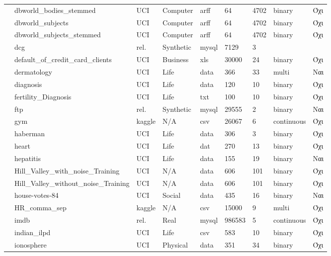{\begin{longtable}{|l| l| l | l | l | l |l | l | l | }
 							\rownumber & dbworld\_bodies\_stemmed & UCI & Computer & arff & 64 & 4702 & binary & Όχι \\
 							\rownumber & dbworld\_subjects & UCI & Computer & arff & 64 & 4702 & binary & Όχι \\
 							\rownumber & dbworld\_subjects\_stemmed & UCI & Computer & arff & 64 & 4702 & binary & Όχι \\
 							\rownumber & dcg \citep{dcg} & rel. & Synthetic & mysql & 7129 & 3 & & \\
 							\rownumber & default\_of\_credit\_card\_clients \citep{default} & UCI & Business & xls & 30000 & 24 & binary & Όχι \\
 							\rownumber & dermatology \citep{dermatology} & UCI & Life & data & 366 & 33 & multi & Ναι \\
 							\rownumber & diagnosis\citep{Czerniak2003} & UCI & Life &data & 120 &10 & binary & Όχι \\
 							\rownumber & fertility\_Diagnosis & UCI & Life & txt & 100 & 10 & binary & Όχι \\
 							\rownumber & ftp \citep{ftp} & rel. & Synthetic & mysql & 29555  & 2 & binary  & Ναι  \\
 							\rownumber & gym \citep{gym} & kaggle & N/A & csv & 26067 & 6 & continuous & Όχι \\
 							\rownumber & haberman \citep{haberman} & UCI & Life & data &  306 & 3 & binary & Όχι \\
 							\rownumber & heart\citep{heart} & UCI & Life &dat & 270&13 &binary & Όχι \\
 							\rownumber & hepatitis \citep{hepatitis} & UCI & Life & data & 155 & 19 & binary & Ναι \\
 							\rownumber & Hill\_Valley\_with\_noise\_Training & UCI & N/A & data & 606 & 101 & binary & Όχι \\
 							\rownumber & Hill\_Valley\_without\_noise\_Training & UCI & N/A & data & 606 & 101 & binary & Όχι \\
 							\rownumber & house-votes-84 & UCI & Social & data & 435 & 16  & binary & Ναι  \\
 							\rownumber & HR\_comma\_sep \citep{hr} & kaggle & N/A & csv & 15000 & 9 & multi & Όχι \\
 							\rownumber & imdb \citep{imdb} & rel. & Real & mysql & 986583 & 5 & continuous & Όχι \\
 							\rownumber & indian\_ilpd & UCI & Life & csv & 583 & 10 & binary & Όχι \\
 							\rownumber & ionosphere \citep{ionoshpere} & UCI & Physical & data  & 351 & 34  &  binary & Όχι \\

\end{longtable}}

